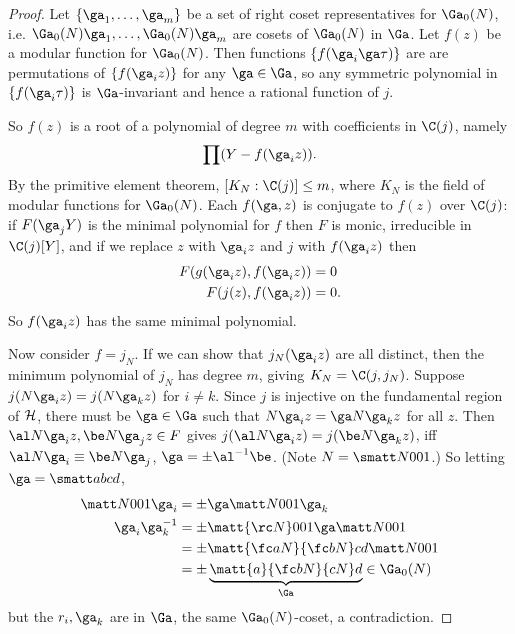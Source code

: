 \begin{proof}
Let $\{\ga_1,\ldots, \ga_m\}$ be a set of right coset representatives for $\Ga_0(N)$, i.e. $\Ga_0(N)\ga_1,\ldots, \Ga_0(N)\ga_m$ are cosets of $\Ga_0(N)$ in $\Ga$. Let $f(z)$ be a modular function for $\Ga_0(N)$. Then functions $\{f(\ga_i\ga \tau)\}$ are are permutations of $\{f(\ga_i z)\}$ for any $\ga\in \Ga$, so any symmetric polynomial in $\{f(\ga_i\tau)\}$ is $\Ga$-invariant and hence a rational function of $j$.

So $f(z)$ is a root of a polynomial of degree $m$ with coefficients in $\C(j)$, namely
\[
\prod (Y-f(\ga_iz)).
\]
By the primitive element theorem, $[K_N:\C(j)]\le m$, where $K_N$ is the field of modular functions for $\Ga_0(N)$. Each $f(\ga,z)$ is conjugate to $f(z)$ over $\C(j)$: if $F(\ga_jY)$ is the minimal polynomial for $f$ then $F$ is monic, irreducible in $\C(j)[Y]$, and if we replace $z$ with $\ga_iz$ and $j$ with $f(\ga_iz)$ then
\begin{align*}
F(g(\ga_iz),f(\ga_iz))&=0\\
F(j(z),f(\ga_iz))&=0.
\end{align*}
So $f(\ga_iz)$ has the same minimal polynomial.

Now consider $f=j_N$. If we can show that $j_N(\ga_iz)$ are all distinct, then the minimum polynomial of $j_N$ has degree $m$, giving $K_N=\C(j,j_N)$. Suppose $j(N\ga_iz)=j(N\ga_kz)$ for $i\ne k$. Since $j$ is injective on the fundamental region of $\cal H$, there must be $\ga \in \Ga$ such that $N\ga_i z=\ga N\ga_kz$ for all $z$. Then $\al N\ga_iz,\be N\ga_jz\in F$ gives $j(\al N\ga_i z)=j(\be N \ga_k z)$, iff $\al N\ga_i\equiv \be N \ga_j$, $\ga=\pm \al^{-1}\be$. (Note $N=\smatt N001$.)
So letting $\ga=\smatt abcd$,
\begin{align*}
\matt N001 \ga_i&=\pm \ga\matt N001\ga_k\\
\ga_i\ga_k^{-1}&=\pm \matt {\rc N}001\ga\matt N001\\
&=\pm \matt{\fc aN}{\fc bN}cd \matt N001\\
&=\pm \underbrace{\matt{a}{\fc bN}{cN}d}_{\Ga}\in \Ga_0(N)
\end{align*}
but the $r_i,\ga_k$ are in $\Ga$, the same $\Ga_0(N)$-coset, a contradiction.
\end{proof}
